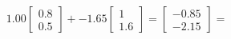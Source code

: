 \documentclass[preview]{standalone}
\begin{document}
\begin{align*}
1.00 \begin{bmatrix} 0.8 \\ 0.5 \end{bmatrix} + -1.65 \begin{bmatrix} 1 \\ 1.6 \end{bmatrix} = \begin{bmatrix} -0.85 \\ -2.15 \end{bmatrix} =
\end{align*}
\end{document}
